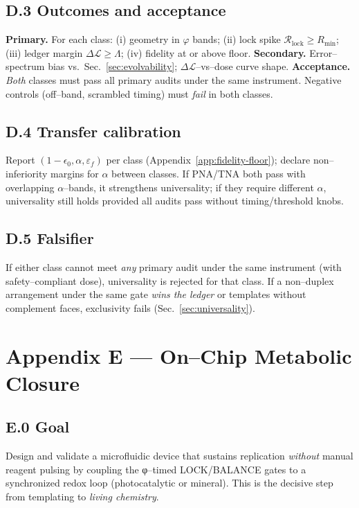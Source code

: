 \documentclass[11pt]{article}
\begin{document}
\subsection*{D.3 Outcomes and acceptance}
\textbf{Primary.} For each class: (i) geometry in $\varphi$ bands; (ii) lock spike $\mathcal{R}_{\mathrm{lock}}\ge R_{\min}$; (iii) ledger margin $\Delta\mathcal{L}\ge \Lambda$; (iv) fidelity at or above floor.  
\textbf{Secondary.} Error–spectrum bias vs.\ Sec.~\ref{sec:evolvability}; $\Delta\mathcal{L}$–vs–dose curve shape.  
\textbf{Acceptance.} \emph{Both} classes must pass all primary audits under the same instrument. Negative controls (off–band, scrambled timing) must \emph{fail} in both classes.

\subsection*{D.4 Transfer calibration}
Report $(1-\epsilon_0,\alpha,\varepsilon_f)$ per class (Appendix~\ref{app:fidelity-floor}); declare non–inferiority margins for $\alpha$ between classes. If PNA/TNA both pass with overlapping $\alpha$–bands, it strengthens universality; if they require different $\alpha$, universality still holds provided all audits pass without timing/threshold knobs.

\subsection*{D.5 Falsifier}
If either class cannot meet \emph{any} primary audit under the same instrument (with safety–compliant dose), universality is rejected for that class. If a non–duplex arrangement under the same gate \emph{wins the ledger} or templates without complement faces, exclusivity fails (Sec.~\ref{sec:universality}).


\section*{Appendix E — On–Chip Metabolic Closure}\label{app:onchip-closure}

\subsection*{E.0 Goal}
Design and validate a microfluidic device that sustains replication \emph{without} manual reagent pulsing by coupling the φ–timed \textsf{LOCK}/\textsf{BALANCE} gates to a synchronized redox loop (photocatalytic or mineral). This is the decisive step from templating to \emph{living chemistry}.
\end{document}
